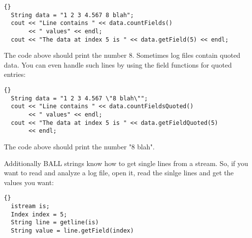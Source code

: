\begin{lstlisting}{}
  String data = "1 2 3 4.567 8 blah";
  cout << "Line contains " << data.countFields() 
       << " values" << endl;
  cout << "The data at index 5 is " << data.getField(5) << endl;
\end{lstlisting}

\noindent
The code above should print the number 8. Sometimes log files contain quoted
data. You can even handle such lines by using the field functions for quoted
entries:

\begin{lstlisting}{}
  String data = "1 2 3 4.567 \"8 blah\"";
  cout << "Line contains " << data.countFieldsQuoted() 
       << " values" << endl;
  cout << "The data at index 5 is " << data.getFieldQuoted(5)
       << endl;
\end{lstlisting}

\noindent
The code above should print the number "8 blah".

Additionally BALL strings know how to get single lines from a stream. So, if
you want to read and analyze a log file, open it, read the sinlge lines and
get the values you want:

\begin{lstlisting}{}
  istream is;
  Index index = 5;
  String line = getline(is)
  String value = line.getField(index)
\end{lstlisting}{}
